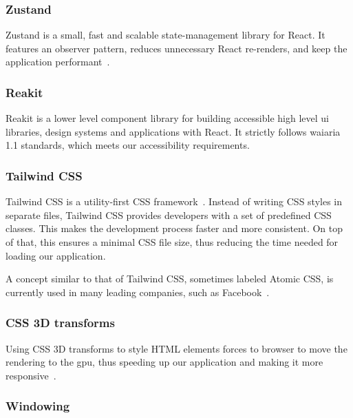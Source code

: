 \subsubsection{Zustand}

Zustand is a small, fast and scalable state-management library for React. It features an observer pattern, reduces unnecessary React re-renders, and keep the application performant~\autocite{noauthor_pmndrs/zustand_2021}.

\subsubsection{Reakit}

Reakit is a lower level component library for building accessible high level \acrshort{ui} libraries, design systems and applications with React. It strictly follows \acrfull{waiaria} 1.1 standards, which meets our accessibility requirements.


\subsubsection{Tailwind CSS}

Tailwind CSS is a utility-first CSS framework~\autocite{noauthor_tailwind_nodate}.
Instead of writing CSS styles in separate files, Tailwind CSS provides developers with a set of predefined CSS classes. This makes the development process faster and more consistent.
On top of that, this ensures a minimal CSS file size, thus reducing the time needed for loading our application.

A concept similar to that of Tailwind CSS, sometimes labeled Atomic CSS, is currently used in many leading companies, such as Facebook~\autocite{noauthor_facebooks_nodate}.

\subsubsection{CSS 3D transforms}

Using CSS 3D transforms to style HTML elements forces to browser to move the rendering to the \acrfull{gpu}, thus speeding up our application and making it more responsive~\autocite{noauthor_improving_nodate}.

\subsubsection{Windowing}

